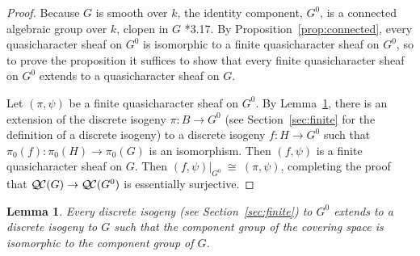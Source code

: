 \documentclass[11pt]{amsart}
\theoremstyle{plain}
\newtheorem{lemma}[theorem]{Lemma}
\theoremstyle{definition}
\theoremstyle{remark}
\newcommand{\Fq}{k}
\newcommand{\iso}{{\ \cong\ }}
\newcommand{\QC}{{\mathcal{Q\hskip-0.8pt C}}}
\begin{document}
\begin{proof}
  Because $G$ is smooth over $\Fq$, the identity component, 
  $G^0$, is a connected algebraic group over $\Fq$, 
  clopen in $G$ \cite{vdGeer-Moonen:AbelianVarieties}*{3.17}. 
  By Proposition~\ref{prop:connected}, every
  quasicharacter sheaf on $G^0$ is isomorphic to a 
  finite quasicharacter sheaf on $G^0$, 
  so to prove the proposition it suffices to show that every 
  finite quasicharacter sheaf on $G^0$ extends to a quasicharacter sheaf on $G$.
  
 Let $(\pi,\psi)$ be a finite quasicharacter sheaf on $G^0$.
 By Lemma~\ref{lemma:ext}, there is an extension of the 
 discrete isogeny $\pi : B \to G^0$ 
 (see Section~\ref{sec:finite} for the definition of a discrete isogeny) 
 to a discrete isogeny $f : H \to G^0$ 
 such that $\pi_0(f) : \pi_0(H)\to \pi_0(G)$ is an isomorphism.
 Then $(f,\psi)$ is a finite quasicharacter sheaf on $G$.
 Then $(f,\psi)\vert_{G^0} \iso (\pi,\psi)$,
 completing the proof that $\QC(G)\to \QC(G^0)$ is essentially surjective.
\end{proof}

\begin{lemma}\label{lemma:ext}
Every discrete isogeny (see Section~\ref{sec:finite}) to $G^0$ extends to a discrete isogeny to $G$ such that the component group of the covering space is isomorphic to the component group of $G$.
\end{lemma}
\end{document}
